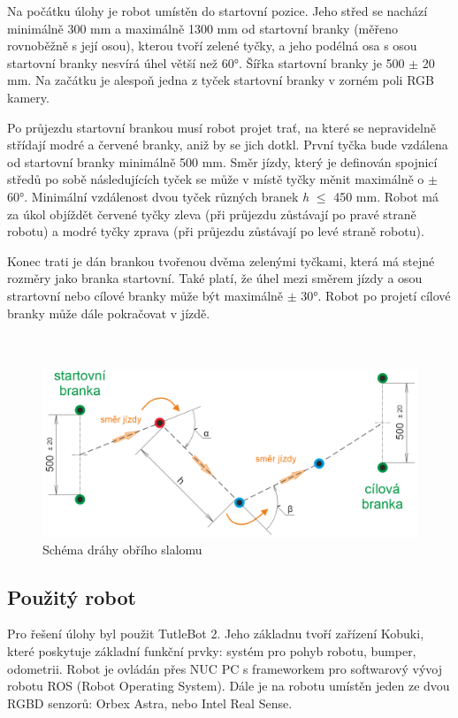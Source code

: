 \documentclass{article}
\begin{document}
	Na počátku úlohy je robot umístěn do startovní pozice. Jeho střed se nachází minimálně 300 mm a maximálně 1300 mm od startovní branky (měřeno rovnoběžně s její osou), kterou tvoří zelené tyčky, a jeho podélná osa s osou startovní branky nesvírá úhel větší než 60°. Šířka startovní branky je 500 $\pm$ 20 mm. Na začátku je alespoň jedna z tyček startovní branky v zorném poli RGB kamery. 
	
	Po průjezdu startovní brankou musí robot projet trať, na které se nepravidelně střídají modré a červené branky, aniž by se jich dotkl. První tyčka bude vzdálena od startovní branky minimálně 500 mm. Směr jízdy, který je definován spojnicí středů po sobě následujících tyček se může v místě tyčky měnit maximálně o $\pm$ 60°. Minimální vzdálenost dvou tyček různých branek {\it h} $\le$ 450 mm. Robot má za úkol objíždět červené tyčky zleva (při průjezdu zůstávají po pravé straně robotu) a modré tyčky zprava (při průjezdu zůstávají po levé straně robotu).
	
	Konec trati je dán brankou tvořenou dvěma zelenými tyčkami, která má stejné rozměry jako branka startovní. Také platí, že úhel mezi směrem jízdy a osou strartovní nebo cílové branky může být maximálně $\pm$ 30°. Robot po projetí cílové branky může dále pokračovat v jízdě. 
	\\
	\\
	\\
	
	
\begin{figure}[h]
	\centering
	\includegraphics[width=12cm]{vykres_slalom_bezny.png}
	\caption{Schéma dráhy obřího slalomu}
\end{figure}

\newpage

\subsection{Použitý robot}

	Pro řešení úlohy byl použit TutleBot 2. Jeho základnu tvoří zařízení Kobuki, které poskytuje základní funkční prvky: systém pro pohyb robotu, bumper, odometrii. Robot je ovládán přes NUC PC s frameworkem pro softwarový vývoj robotu ROS (Robot Operating System). Dále je na robotu umístěn jeden ze dvou RGBD senzorů: Orbex Astra, nebo Intel Real Sense. %
	\\
	\\
	\\
	
\end{document}
